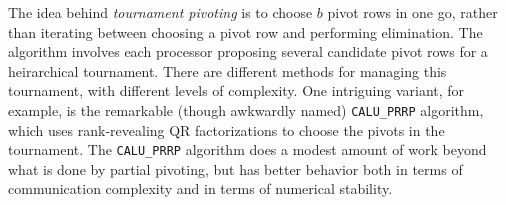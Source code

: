 \documentclass[12pt, leqno]{article} %
\begin{document}
The idea behind {\em tournament pivoting} is to choose $b$ pivot rows in
one go, rather than iterating between choosing a pivot row and
performing elimination.  The algorithm involves each processor proposing
several candidate pivot rows for a heirarchical tournament.  There are
different methods for managing this tournament, with different levels of
complexity.  One intriguing variant, for example, is the remarkable
(though awkwardly named) {\tt CALU\_PRRP} algorithm, which uses
rank-revealing QR factorizations to choose the pivots in the tournament.
The {\tt CALU\_PRRP} algorithm does a modest amount of work beyond what
is done by partial pivoting, but has better behavior both in terms of
communication complexity and in terms of numerical stability.
\end{document}
